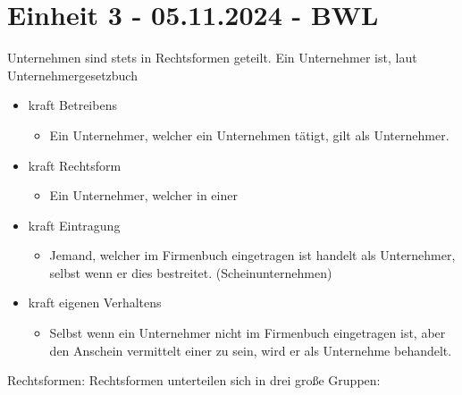 \documentclass{article}
\begin{document}
	\section{Einheit 3 - 05.11.2024 - BWL}
	Unternehmen sind stets in Rechtsformen geteilt. Ein Unternehmer ist, laut Unternehmergesetzbuch \begin{itemize}
		\item{kraft Betreibens}
		\begin{itemize}
			\item{Ein Unternehmer, welcher ein Unternehmen tätigt, gilt als Unternehmer.}
		\end{itemize}
		\item{kraft Rechtsform}
		\begin{itemize}
			\item{Ein Unternehmer, welcher in einer }
		\end{itemize}
		\item{kraft Eintragung}
		\begin{itemize}
			\item{Jemand, welcher im Firmenbuch eingetragen ist handelt als Unternehmer, selbst wenn er dies bestreitet. (Scheinunternehmen)}
		\end{itemize}
		\item{kraft eigenen Verhaltens}
		\begin{itemize}
			\item{Selbst wenn ein Unternehmer nicht im Firmenbuch eingetragen ist, aber den Anschein vermittelt einer zu sein, wird er als Unternehme behandelt.}
		\end{itemize}
	\end{itemize}
	Rechtsformen:
	Rechtsformen unterteilen sich in drei große Gruppen:
\end{document}
